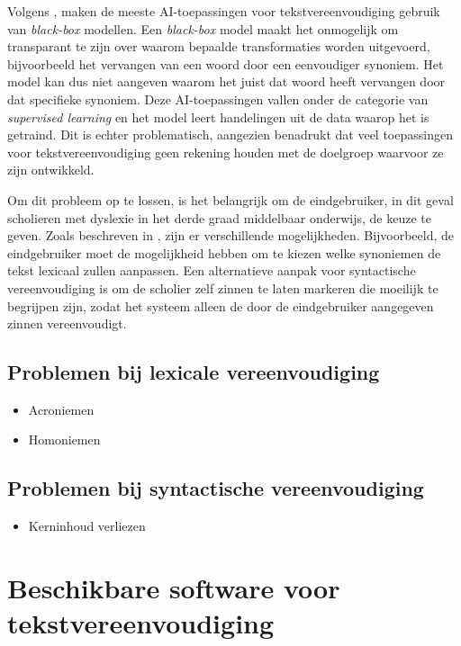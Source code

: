Volgens \textcite{Punardeep2020}, maken de meeste AI-toepassingen voor tekstvereenvoudiging gebruik van \textit{black-box} modellen. Een \textit{black-box} model maakt het onmogelijk om transparant te zijn over waarom bepaalde transformaties worden uitgevoerd, bijvoorbeeld het vervangen van een woord door een eenvoudiger synoniem. Het model kan dus niet aangeven waarom het juist dat woord heeft vervangen door dat specifieke synoniem. Deze AI-toepassingen vallen onder de categorie van \textit{supervised learning} en het model leert handelingen uit de data waarop het is getraind. Dit is echter problematisch, aangezien \textcite{Xu2015} benadrukt dat veel toepassingen voor tekstvereenvoudiging geen rekening houden met de doelgroep waarvoor ze zijn ontwikkeld.

Om dit probleem op te lossen, is het belangrijk om de eindgebruiker, in dit geval scholieren met dyslexie in het derde graad middelbaar onderwijs, de keuze te geven. Zoals beschreven in \textcite{Gooding2022}, zijn er verschillende mogelijkheden. Bijvoorbeeld, de eindgebruiker moet de mogelijkheid hebben om te kiezen welke synoniemen de tekst lexicaal zullen aanpassen. Een alternatieve aanpak voor syntactische vereenvoudiging is om de scholier zelf zinnen te laten markeren die moeilijk te begrijpen zijn, zodat het systeem alleen de door de eindgebruiker aangegeven zinnen vereenvoudigt.


\subsection{Problemen bij lexicale vereenvoudiging}

\begin{itemize}
	\item Acroniemen
	\item Homoniemen
\end{itemize}

\subsection{Problemen bij syntactische vereenvoudiging}

\begin{itemize}
	\item Kerninhoud verliezen
\end{itemize}

\section{Beschikbare software voor tekstvereenvoudiging}

